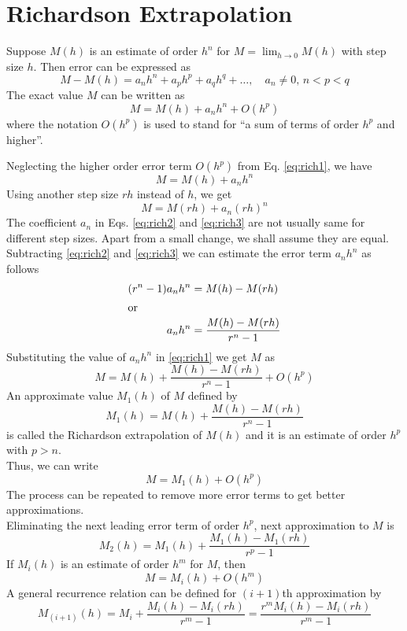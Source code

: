 \documentclass[12pt,class=book,crop=false]{standalone}
\begin{document}
\section{Richardson Extrapolation}

Suppose $ M(h) $ is an estimate of order $ h^n $ for $ M=\lim_{h\to 0} M(h) $ with step size $ h $. Then error can be expressed as
\[
    M-M(h)=a_n h^n+a_p h^p+a_q h^q+\dots,\quad a_n\neq 0,\,n<p<q
\]
The exact value $ M $ can be written as
\begin{equation}
    M=M(h)+a_n h^n+O(h^p)
    \label{eq:rich1}
\end{equation}
where the notation $ O(h^p) $ is used to stand for ``a sum of terms of order $ h^p $ and higher''.


Neglecting the higher order error term $ O(h^p) $ from Eq. \eqref{eq:rich1}, we have
\begin{equation}
    M=M(h)+a_n h^n
    \label{eq:rich2}
\end{equation}
Using another step size $ rh $ instead of $ h $, we get
\begin{equation}
    \label{eq:rich3}
    M=M(rh)+a_n (rh)^n
\end{equation}
The coefficient $ a_n $ in Eqs. \eqref{eq:rich2} and \eqref{eq:rich3} are not usually same for different step sizes. Apart from a small change, we shall assume they are equal.\\
Subtracting \eqref{eq:rich2} and \eqref{eq:rich3} we can estimate the error term $ a_n h^n $ as follows
\begin{align*}
    (r^n-1)a_n h^n & =M(h)-M(rh)               \\
    \intertext{or}
    a_n h^n        & =\frac{M(h)-M(rh)}{r^n-1}
\end{align*}
Substituting the value of $ a_n h^n $ in \eqref{eq:rich1} we get $ M $ as
\[
    M=M(h)+\frac{M(h)-M(rh)}{r^n-1}+O(h^p)
\]
An approximate value $ M_1 (h) $ of $ M $ defined by
\[
    M_1 (h)=M(h)+\frac{M(h)-M(rh)}{r^n-1}
\]
is called the Richardson extrapolation of $ M(h) $ and it is an estimate of order $ h^p $ with $ p>n $.\\
Thus, we can write
\[
    M=M_1 (h)+O(h^p)
\]
The process can be repeated to remove more error terms to get better approximations.\\
Eliminating the next leading error term of order $ h^p $, next approximation to $ M $ is
\[
    M_2 (h)=M_1 (h)+\frac{M_1 (h)-M_1 (rh)}{r^p-1}
\]
If $ M_i (h) $ is an estimate of order $ h^m $ for $ M $, then
\[
    M=M_i (h)+O(h^m)
\]
A general recurrence relation can be defined for $ (i+1) $th approximation by
\[
    M_(i+1) (h)=M_i+\frac{M_i (h)-M_i (rh)}{r^m-1}=\frac{r^m M_i (h)-M_i (rh)}{r^m-1}
\]
\end{document}

